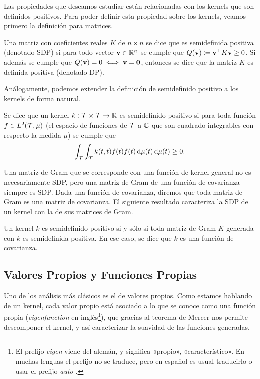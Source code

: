 Las propiedades que deseamos estudiar están relacionadas con los kernels que son definidos positivos. Para poder definir esta propiedad sobre los kernels, veamos primero la definición para matrices.

\begin{definition}
	Una matriz con coeficientes reales \(K\) de \(n \times n\) se dice que es semidefinida positiva (denotado SDP) si para todo vector \(\mathbf{v} \in \mathbb{R}^n\) se cumple que \(Q(\mathbf{v}) \coloneqq \mathbf{v}^{\top} K \mathbf{v} \geq 0\). Si además se cumple que \(Q(\mathbf{v}) = 0 \iff \mathbf{v} = \mathbf{0}\), entonces se dice que la matriz \(K\) es definida positiva (denotado DP).
\end{definition}


Análogamente, podemos extender la definición de semidefinido positivo a los kernels de forma natural.

\begin{definition}
	Se dice que un kernel \(k : \mathcal{T} \times \mathcal{T} \to \mathbb{R}\) es semidefinido positivo si para toda función \(f \in L^{2}(\mathcal{T}, \mu) \) (el espacio de funciones de \(\mathcal{T}\) a \(\mathbb{C}\) que son cuadrado-integrables con respecto la medida \(\mu\)) se cumple que
	\begin{equation*}
		\int_{\mathcal{T}} \int_{\mathcal{T}} k(t, \bar{t}) f(t) f(\bar{t}) \dd{\mu(t)} \dd{\mu(\bar{t})} \geq 0.
	\end{equation*}
\end{definition}

Una matriz de Gram que se corresponde con una función de kernel general no es necesariamente SDP, pero una matriz de Gram de una función de covarianza siempre es SDP. Dada una función de covarianza, diremos que toda matriz de Gram es una matriz de covarianza. El siguiente resultado caracteriza la SDP de un kernel con la de sus matrices de Gram.

\begin{proposition}
	Un kernel \(k\) es semidefinido positivo si y sólo si toda matriz de Gram \(K\) generada con \(k\) es semidefinida positiva. En ese caso, se dice que \(k\) es una función de covarianza.
\end{proposition}


\subsection{Valores Propios y Funciones Propias}
Uno de los análisis más clásicos es el de valores propios. Como estamos hablando de un kernel, cada valor propio está asociado a lo que se conoce como una función propia (\emph{eigenfunction} en inglés\footnote{El prefijo \emph{eigen} viene del alemán, y significa «propio», «característico». En muchas lenguas el prefijo no se traduce, pero en español es usual traducirlo o usar el prefijo \emph{auto-}.}), que gracias al teorema de Mercer nos permite descomponer el kernel, y así caracterizar la suavidad de las funciones generadas.

